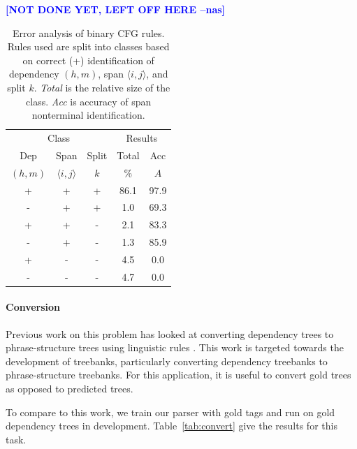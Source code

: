 \documentclass[11pt,letterpaper]{article}
\newcommand{\Span}[1]{\langle #1 \rangle}
\newcommand{\nascomment}[1]{\textcolor{blue}{\bf \small [#1 --nas]}}
\begin{document}
\nascomment{NOT DONE YET, LEFT OFF HERE}

\begin{table}
  \centering
  \footnotesize
  \begin{tabular}{|ccc|cc|}
    \hline 
    \multicolumn{3}{|c|}{Class} & \multicolumn{2}{|c|}{Results} \\
    Dep & Span & Split & Total & Acc  \\ 
    $(h, m)$ & $\Span{i,j}$ & $k$ & \% & $A$ \\ 
    \hline
    + & + & +  &  86.1  & 97.9   \\ 
    - & + & +  &  1.0   & 69.3   \\ 
    + & + & -  &  2.1   & 83.3   \\ 
    - & + & -  &  1.3   & 85.9   \\ 
    + & - & -  &  4.5   & 0.0    \\ 
    - & - & -  &  4.7   & 0.0    \\ 
    \hline
  \end{tabular}
  \label{tab:analysis}
  \caption{Error analysis of binary CFG rules. Rules used are split into classes based on 
    correct (+) identification of dependency $(h,m)$, span $\Span{i,j}$, and split $k$. 
    \textit{Total} is the relative size of the class. \textit{Acc} is accuracy of span nonterminal identification.
  }
\end{table}

\paragraph{Conversion}

Previous work on this problem has looked at converting dependency trees to phrase-structure trees using linguistic rules \cite{xia2001converting,xia2009towards}. This work is targeted towards the development of treebanks, particularly converting dependency treebanks to phrase-structure treebanks.
For this application, it is useful to convert gold trees as opposed to predicted trees.

To compare to this work, we train our parser with gold tags and run on gold dependency trees in development. Table~\ref{tab:convert} give the results for this task.



\end{document}
